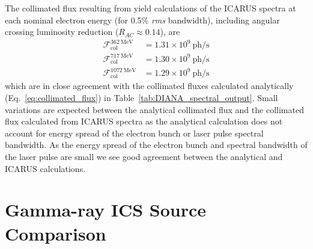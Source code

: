 \documentclass[../main.tex]{subfiles}
\begin{document}
The collimated flux resulting from yield calculations of the \textsc{ICARUS} spectra at each nominal electron energy (for 0.5\% \textit{rms} bandwidth), including angular crossing luminosity reduction ($R_{AC} \approx 0.14$), are
\begin{align}
\mathcal{F}_{\mathrm{col}}^{362~\si{\mega\electronvolt}} &= 1.31\times 10^{9}~\mathrm{ph}/\si{\second} \nonumber\\
\mathcal{F}_{\mathrm{col}}^{717~\si{\mega\electronvolt}} &= 1.30\times 10^{9}~\mathrm{ph}/\si{\second} \nonumber\\
\mathcal{F}_{\mathrm{col}}^{1072~\si{\mega\electronvolt}} &= 1.29\times 10^{9}~\mathrm{ph}/\si{\second} \nonumber
\end{align}
which are in close agreement with the collimated fluxes calculated analytically (Eq.~\ref{eq:collimated_flux}) in Table~\ref{tab:DIANA_spectral_output}. Small variations are expected between the analytical collimated flux and the collimated flux calculated from \textsc{ICARUS} spectra as the analytical calculation does not account for energy spread of the electron bunch or laser pulse spectral bandwidth. As the energy spread of the electron bunch and spectral bandwidth of the laser pulse are small we see good agreement between the analytical and \textsc{ICARUS} calculations.

\section{Gamma-ray ICS Source Comparison}
\label{sec:gamma_ICS_comparison}
\end{document}
